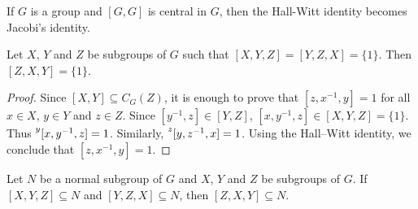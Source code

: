 If $G$ is a group and $[G,G]$ is central in $G$,
then the Hall-Witt identity becomes Jacobi's identity.

\begin{lemma}
	\label{lemma:3subgrupos}
	Let $X$, $Y$ and $Z$ be subgroups of $G$ 
 such that $[X,Y,Z]=[Y,Z,X]=\{1\}$.
	Then $[Z,X,Y]=\{1\}$.
\end{lemma}

\begin{proof}
Since $[X,Y]\subseteq C_G(Z)$, 
it is enough to prove that $[z,x^{-1},y]=1$ for all $x\in X$, $y\in Y$ and $z\in Z$. Since $[y^{-1},z]\in [Y,Z]$, $[x,y^{-1},z]\in [X,Y,Z]=\{1\}$. Thus $\prescript{y}{}[x,y^{-1},z]=1$. Similarly, $\prescript{z}{}[y,z^{-1},x]=1$. Using the Hall--Witt identity, we conclude that $[z,x^{-1},y]=1$.
\end{proof}

\begin{exercise}
\label{xca:3subgroups}
Let $N$ be a normal subgroup of $G$ and 
$X$, $Y$ and $Z$ be subgroups of $G$. If $[X,Y,Z]\subseteq N$ and $[Y,Z,X]\subseteq N$, then 
$[Z,X,Y]\subseteq N$.
\end{exercise}


